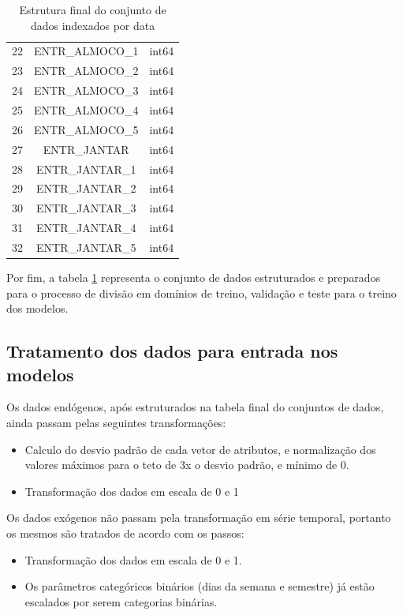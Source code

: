 \begin{table}[!ht]
\begin{tabular}{|c|c|c|}
                22&	ENTR\_ALMOCO\_1				&int64 \\
                23&	ENTR\_ALMOCO\_2				&int64 \\
                24&	ENTR\_ALMOCO\_3				&int64 \\ 
                25&	ENTR\_ALMOCO\_4				&int64 \\
                26&	ENTR\_ALMOCO\_5				&int64 \\
                27&	ENTR\_JANTAR				&	int64 \\ 
                28&	ENTR\_JANTAR\_1				&int64\\
                29&	ENTR\_JANTAR\_2				&int64 \\ 
                30&	ENTR\_JANTAR\_3				&int64 \\ 
                31&	ENTR\_JANTAR\_4				&int64 \\
                32&	ENTR\_JANTAR\_5				&int64\\
              \hline
            \end{tabular}
            \caption{Estrutura final do conjunto de dados indexados por data}
            \label{table:dataset_final}
        \end{table}
        Por fim, a tabela \ref{table:dataset_final} representa o conjunto de dados estruturados e preparados para o processo de divisão em domínios de treino, validação e teste para o treino dos modelos.
        
        \subsection{Tratamento dos dados para entrada nos modelos}
         	Os dados endógenos, após estruturados na tabela final do conjuntos de dados, ainda passam pelas seguintes transformações:
         	\begin{itemize}
                \item	Calculo do desvio padrão de cada vetor de atributos, e normalização dos valores máximos para o teto de 3x o desvio padrão, e mínimo de 0. 
                \item	Transformação dos dados em escala de 0 e 1
            \end{itemize}
            Os dados exógenos não passam pela transformação em série temporal, portanto os mesmos são tratados de acordo com os passos:
            \begin{itemize}
                \item	Transformação dos dados em escala de 0 e 1.
                \item	Os parâmetros categóricos binários (dias da semana e semestre) já estão escalados por serem categorias binárias.
            \end{itemize}

